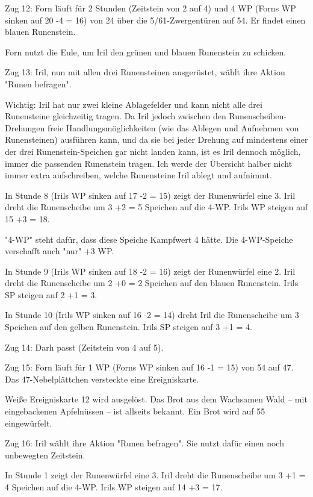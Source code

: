 \documentclass[10pt, a4paper, oneside]{book}
\begin{document}
{Zug 12: Forn läuft für 2 Stunden (Zeitstein von 2 auf 4) und 4 WP (Forns WP sinken auf 20 -4 = 16) von 24 über die 5/61-Zwergentüren auf 54. Er findet einen blauen Runenstein.

Forn nutzt die Eule, um Iril den grünen und blauen Runenstein zu schicken.



Zug 13: Iril, nun mit allen drei Runensteinen ausgerüstet, wählt ihre Aktion "Runen befragen".

Wichtig: Iril hat nur zwei kleine Ablagefelder und kann nicht alle drei Runensteine gleichzeitig tragen. Da Iril jedoch zwischen den Runenscheiben-Drehungen freie Handlungsmöglichkeiten (wie das Ablegen und Aufnehmen von Runensteinen) ausführen kann, und da sie bei jeder Drehung auf mindestens einer der drei Runenstein-Speichen gar nicht landen kann, ist es Iril dennoch möglich, immer die passenden Runenstein tragen. Ich werde der Übersicht halber nicht immer extra aufschreiben, welche Runensteine Iril ablegt und aufnimmt.

In Stunde 8 (Irils WP sinken auf 17 -2 = 15) zeigt der Runenwürfel eine 3. Iril dreht die Runenscheibe um 3 +2 = 5 Speichen auf die 4-WP. Irils WP steigen auf 15 +3 = 18.

"4-WP" steht dafür, dass diese Speiche Kampfwert 4 hätte. Die 4-WP-Speiche verschafft auch "nur" +3 WP.

In Stunde 9 (Irils WP sinken auf 18 -2 = 16) zeigt der Runenwürfel eine 2. Iril dreht die Runenscheibe um 2 +0 = 2 Speichen auf den blauen Runenstein. Irils SP steigen auf 2 +1 = 3.

In Stunde 10 (Irils WP sinken auf 16 -2 = 14) dreht Iril die Runenscheibe um 3 Speichen auf den gelben Runenstein. Irils SP steigen auf 3 +1 = 4.



Zug 14: Darh passt (Zeitstein von 4 auf 5).



Zug 15: Forn läuft für 1 WP (Forns WP sinken auf 16 -1 = 15) von 54 auf 47. Das 47-Nebelplättchen versteckte eine Ereigniskarte.

Weiße Ereigniskarte 12 wird ausgelöst. Das Brot aus dem Wachsamen Wald – mit eingebackenen Apfelnüssen – ist allseits bekannt. Ein Brot wird auf 55 eingewürfelt.



Zug 16: Iril wählt ihre Aktion "Runen befragen". Sie nutzt dafür einen noch unbewegten Zeitstein.

In Stunde 1 zeigt der Runenwürfel eine 3. Iril dreht die Runenscheibe um 3 +1 = 4 Speichen auf die 4-WP. Irils WP steigen auf 14 +3 = 17.

}
\end{document}
